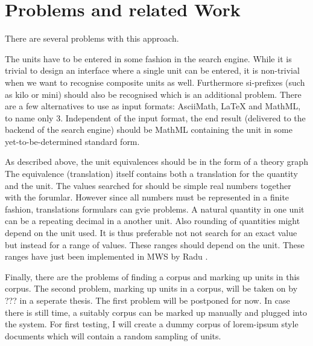 \documentclass[11pt]{article}
\begin{document}

\section{Problems and related Work}
\label{sec:problems_relatedwork}

There are several problems with this approach. 

The units have to be entered in some fashion in the search engine. While it is trivial to design an interface where a single unit can be entered, it is non-trivial when we want to recognise composite units as well. Furthermore si-prefixes (such as kilo or mini) should also be recognised which is an additional problem. There are a few alternatives to use as input formats: AsciiMath, LaTeX and MathML, to name only 3. Independent of the input format, the end result (delivered to the backend of the search engine) should be MathML containing the unit in some yet-to-be-determined standard form.

As described above, the unit equivalences should be in the form of a theory graph  The equivalence
(translation) itself contains both a translation for the quantity and the unit. The values searched for should be simple real numbers together with the forumlar. However since all numbers must be represented in a finite fashion, translations formulars can gvie problems. A natural quantity in one unit can be a repeating decimal in a another unit. Also rounding of quantities might depend on the unit used. It is thus preferable not not search for an exact value but instead for a range of values. These ranges should depend on the unit. These ranges have just been implemented in MWS by Radu . 

Finally, there are the problems of finding a corpus and marking up units in this corpus. The second problem, marking up units in a corpus, will be taken on by ??? in a seperate thesis. The first problem will be postponed for now. In case there is still time, a suitably corpus can be marked up manually and plugged into the system. For first testing, I will create a dummy corpus of lorem-ipsum style documents which will contain a random sampling of units.


\end{document}
